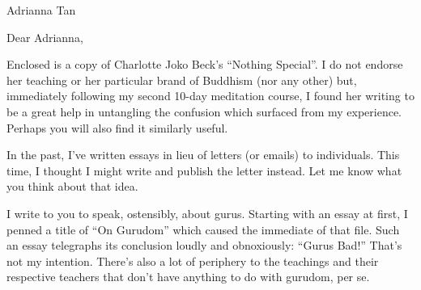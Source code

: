 \documentclass{letter}
\begin{document}
\begin{letter}{Adrianna Tan}
\opening{Dear Adrianna,}

Enclosed is a copy of Charlotte Joko Beck's ``Nothing Special''.
I do not endorse her teaching or her particular brand of Buddhism (nor any other) but, immediately following my second 10-day meditation course, I found her writing to be a great help in untangling the confusion which surfaced from my experience.
Perhaps you will also find it similarly useful.

In the past, I've written essays in lieu of letters (or emails) to individuals.
This time, I thought I might write and publish the letter instead.
Let me know what you think about that idea.

I write to you to speak, ostensibly, about gurus.
Starting with an essay at first, I penned a title of ``On Gurudom'' which caused the immediate  of that file.
Such an essay telegraphs its conclusion loudly and obnoxiously: ``Gurus Bad!''
That's not my intention.
There's also a lot of periphery to the teachings and their respective teachers that don't have anything to do with gurudom, per se.



\end{letter}
\end{document}
